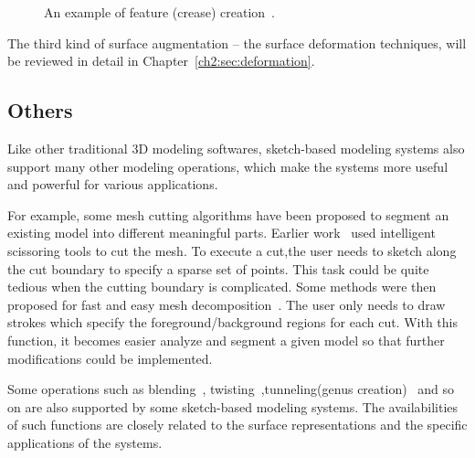 \begin{figure} [htbp]
\renewcommand{\thesubfigure}{}
  \centering
  \caption{An example of feature (crease) creation~\cite{NSAC05}.}
  \label{fig:featurecreation} %
\end{figure}

The third kind of surface augmentation -- the surface deformation techniques, will be reviewed in detail in Chapter~\ref{ch2:sec:deformation}.


\subsection{Others}\label{ch2:sec:sbim:others}

Like other traditional 3D modeling softwares, sketch-based modeling systems also support many other modeling operations, which make the systems more useful and powerful for various applications.

For example, some mesh cutting algorithms have been proposed to segment an existing model into different meaningful parts. Earlier work~\cite{IMT99,FKSMKTRD04,LLSCS04} used intelligent scissoring tools to cut the mesh. To execute a cut,the user needs to sketch along the cut boundary to specify a sparse set of points. This task could be quite tedious when the cutting boundary is complicated. Some methods were then proposed for fast and easy mesh decomposition~\cite{JLCW06,WPPYM07,MJL08,BMB09}. The user only needs to draw strokes which specify the foreground/background regions for each cut. With this function, it becomes easier analyze and segment a given model so that further modifications could be implemented.

Some operations such as blending~\cite{CSSJ05,WM07}, twisting~\cite{BK04},tunneling(genus creation)~\cite{IMT99,NISA07} and so on are also supported by some sketch-based modeling systems. The availabilities of such functions are closely related to the surface representations and the specific applications of the systems.

